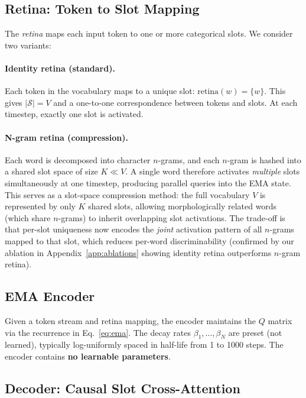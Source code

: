 \documentclass[11pt]{article}
\begin{document}
\subsection{Retina: Token to Slot Mapping}

The \emph{retina} maps each input token to one or more categorical slots. We consider two variants:

\paragraph{Identity retina (standard).} Each token in the vocabulary maps to a unique slot: $\text{retina}(w) = \{w\}$. This gives $|\mathcal{S}| = V$ and a one-to-one correspondence between tokens and slots. At each timestep, exactly one slot is activated.

\paragraph{N-gram retina (compression).} Each word is decomposed into character $n$-grams, and each $n$-gram is hashed into a shared slot space of size $K \ll V$. A single word therefore activates \emph{multiple} slots simultaneously at one timestep, producing parallel queries into the EMA state. This serves as a slot-space compression method: the full vocabulary $V$ is represented by only $K$ shared slots, allowing morphologically related words (which share $n$-grams) to inherit overlapping slot activations. The trade-off is that per-slot uniqueness now encodes the \emph{joint} activation pattern of all $n$-grams mapped to that slot, which reduces per-word discriminability (confirmed by our ablation in Appendix~\ref{app:ablations} showing identity retina outperforms $n$-gram retina).

\subsection{EMA Encoder}

Given a token stream and retina mapping, the encoder maintains the $Q$ matrix via the recurrence in Eq.~\eqref{eq:ema}. The decay rates $\beta_1, \dots, \beta_N$ are preset (not learned), typically log-uniformly spaced in half-life from 1 to 1000 steps. The encoder contains \textbf{no learnable parameters}.

\subsection{Decoder: Causal Slot Cross-Attention}
\end{document}
